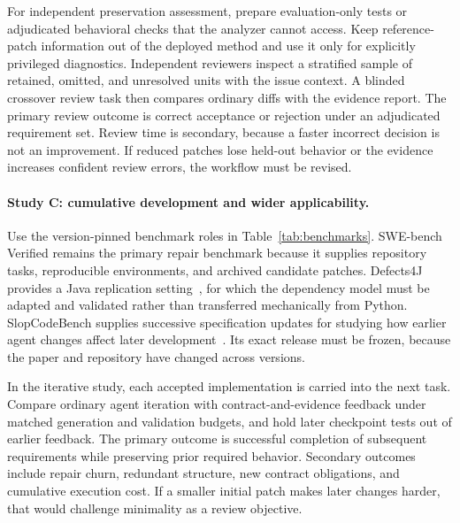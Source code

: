 \documentclass[a4paper,fleqn]{cas-sc}
\begin{document}
For independent preservation assessment, prepare evaluation-only tests or adjudicated behavioral checks that the analyzer cannot access. Keep reference-patch information out of the deployed method and use it only for explicitly privileged diagnostics. Independent reviewers inspect a stratified sample of retained, omitted, and unresolved units with the issue context. A blinded crossover review task then compares ordinary diffs with the evidence report. The primary review outcome is correct acceptance or rejection under an adjudicated requirement set. Review time is secondary, because a faster incorrect decision is not an improvement. If reduced patches lose held-out behavior or the evidence increases confident review errors, the workflow must be revised.

\paragraph{Study C: cumulative development and wider applicability.}
Use the version-pinned benchmark roles in Table~\ref{tab:benchmarks}. SWE-bench Verified remains the primary repair benchmark because it supplies repository tasks, reproducible environments, and archived candidate patches. Defects4J provides a Java replication setting~\citep{just2014defects4j}, for which the dependency model must be adapted and validated rather than transferred mechanically from Python. SlopCodeBench supplies successive specification updates for studying how earlier agent changes affect later development~\citep{orlanski2026slopcodebench}. Its exact release must be frozen, because the paper and repository have changed across versions.

In the iterative study, each accepted implementation is carried into the next task. Compare ordinary agent iteration with contract-and-evidence feedback under matched generation and validation budgets, and hold later checkpoint tests out of earlier feedback. The primary outcome is successful completion of subsequent requirements while preserving prior required behavior. Secondary outcomes include repair churn, redundant structure, new contract obligations, and cumulative execution cost. If a smaller initial patch makes later changes harder, that would challenge minimality as a review objective.
\end{document}
